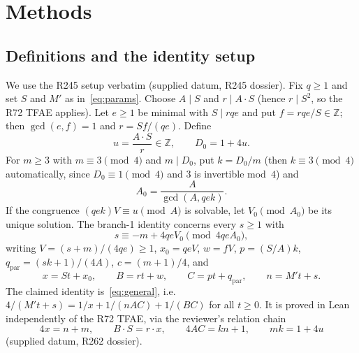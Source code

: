 \documentclass[11pt,a4paper]{article}
\theoremstyle{definition}
\begin{document}
\section{Methods}

\subsection{Definitions and the identity setup}
\label{sec:setup}

We use the R245 setup verbatim (supplied datum, R245 dossier). Fix
$q\ge1$ and set $S$ and $M'$ as in~\eqref{eq:params}. Choose
$A\mid S$ and $r\mid A\cdot S$ (hence $r\mid S^2$, so the R72 TFAE
applies). Let $e\ge1$ be minimal with $S\mid rqe$ and put
$f=rqe/S\in\mathbb{Z}$; then $\gcd(e,f)=1$ and $r=Sf/(qe)$. Define
\begin{equation}
  \label{eq:uD0}
  u=\frac{A\cdot S}{r}\in\mathbb{Z},\qquad D_0=1+4u.
\end{equation}
For $m\ge3$ with $m\equiv3\pmod4$ and $m\mid D_0$, put $k=D_0/m$ (then
$k\equiv3\pmod4$ automatically, since $D_0\equiv1\pmod4$ and $3$ is
invertible mod~$4$) and
\begin{equation}
  \label{eq:A0}
  A_0=\frac{A}{\gcd(A,qek)}.
\end{equation}
If the congruence $(qek)V\equiv u\pmod A$ is solvable, let $V_0\pmod{A_0}$
be its unique solution. The branch-1 identity concerns every
$s\ge1$ with
\begin{equation}
  \label{eq:resclass}
  s\equiv-m+4qeV_0\pmod{4qeA_0},
\end{equation}
writing $V=(s+m)/(4qe)\ge1$, $x_0=qeV$, $w=fV$,
$p=(S/A)k$, $q_{\mathrm{par}}=(sk+1)/(4A)$, $c=(m+1)/4$, and
\begin{equation}
  \label{eq:branch1params}
  x=St+x_0,\qquad B=rt+w,\qquad C=pt+q_{\mathrm{par}},\qquad n=M't+s.
\end{equation}
The claimed identity is~\eqref{eq:general}, i.e.
$4/(M't+s)=1/x+1/(nAC)+1/(BC)$ for all $t\ge0$. It is proved in Lean
independently of the R72 TFAE, via the reviewer's relation chain
\begin{equation}
  \label{eq:chain}
  4x=n+m,\qquad B\cdot S=r\cdot x,\qquad 4AC=kn+1,\qquad mk=1+4u
\end{equation}
(supplied datum, R262 dossier).
\end{document}
